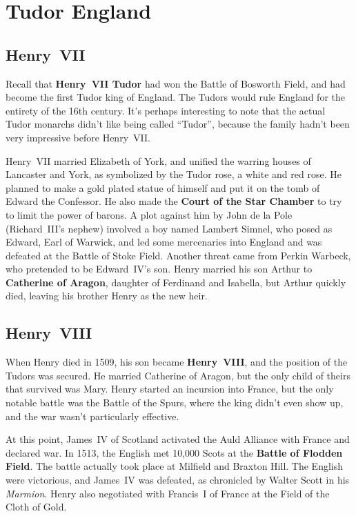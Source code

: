 \section{Tudor England}

\subsection*{Henry~VII}

Recall that \textbf{Henry~VII Tudor} had won the Battle of Bosworth Field,
and had become the first Tudor king of England.
The Tudors would rule England for the entirety of the 16th century.
It's perhaps interesting to note that the actual Tudor monarchs didn't like being called ``Tudor'',
because the family hadn't been very impressive before Henry~VII\@.

Henry~VII married Elizabeth of York, and unified the warring houses of Lancaster and York,
as symbolized by the Tudor rose, a white and red rose.
He planned to make a gold plated statue of himself and put it on the tomb of Edward the Confessor.
He also made the \textbf{Court of the Star Chamber} to try to limit the power of barons.
A plot against him by John de la Pole (Richard~III's nephew) involved a boy named Lambert Simnel,
who posed as Edward, Earl of Warwick,
and led some mercenaries into England and was defeated at the Battle of Stoke Field.
Another threat came from Perkin Warbeck, who pretended to be Edward~IV's son.
Henry married his son Arthur to \textbf{Catherine of Aragon}, daughter of Ferdinand and Isabella,
but Arthur quickly died, leaving his brother Henry as the new heir.

\subsection*{Henry~VIII}

When Henry died in 1509, his son became \textbf{Henry~VIII}, and the position of the Tudors was secured.
He married Catherine of Aragon, but the only child of theirs that survived was Mary.
Henry started an incursion into France, but the only notable battle was the Battle of the Spurs,
where the king didn't even show up, and the war wasn't particularly effective.

At this point, James~IV of Scotland activated the Auld Alliance with France and declared war.
In 1513, the English met 10,000 Scots at the \textbf{Battle of Flodden Field}.
The battle actually took place at Milfield and Braxton Hill.
The English were victorious, and James~IV was defeated, as chronicled by Walter Scott in his \textit{Marmion}.
Henry also negotiated with Francis~I of France at the Field of the Cloth of Gold.

